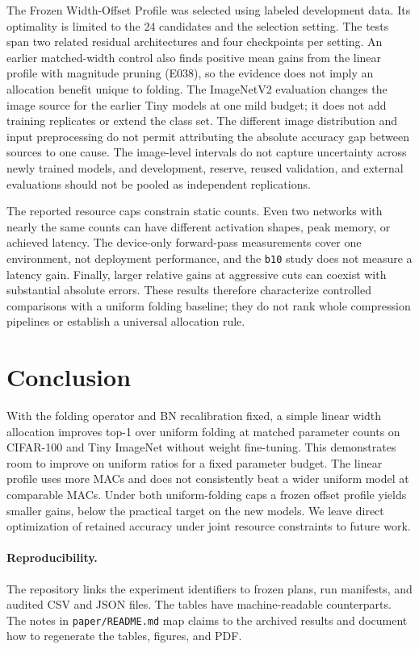 \documentclass[11pt,a4paper]{article}
\newcommand{\FrozenProfile}{Frozen Width-Offset Profile}
\newcommand{\bten}{\texttt{b10}}
\begin{document}
The \FrozenProfile{} was selected using labeled development data. Its
optimality is limited to the 24 candidates and the selection setting.
The tests span two related residual architectures and four
checkpoints per setting. An earlier matched-width control also finds
positive mean gains from the linear profile with magnitude pruning (E038),
so the evidence does not imply an allocation benefit unique to folding.
The ImageNetV2 evaluation changes the image source for the earlier Tiny
models at one mild budget; it does not add training
replicates or extend the class set. The different image distribution and
input preprocessing do not permit attributing the absolute accuracy gap
between sources to one cause. The image-level intervals do not capture uncertainty across
newly trained models, and development, reserve, reused validation, and
external evaluations should not be pooled as independent replications.

The reported resource caps constrain static counts. Even two networks
with nearly the same counts can have different activation shapes, peak
memory, or achieved latency. The device-only forward-pass measurements
cover one environment, not deployment performance, and the \bten{} study
does not measure a latency gain. Finally, larger relative gains at
aggressive cuts can coexist with substantial absolute errors. These results therefore
characterize controlled comparisons with a uniform folding baseline;
they do not rank whole compression pipelines or establish a universal
allocation rule.

\section{Conclusion}

With the folding operator and BN recalibration fixed, a simple linear
width allocation improves top-1 over uniform folding at matched parameter
counts on CIFAR-100 and Tiny ImageNet without weight fine-tuning. This
demonstrates room to improve on uniform ratios for a fixed parameter
budget. The linear profile uses more MACs and does not consistently beat
a wider uniform model at comparable MACs. Under both uniform-folding
caps a frozen offset profile yields smaller gains, below the practical
target on the new models. We leave direct optimization of retained
accuracy under joint resource constraints to future work.

\paragraph{Reproducibility.} The repository links the experiment identifiers
to frozen plans, run manifests, and audited CSV and JSON files. The tables
have machine-readable counterparts. The notes in \texttt{paper/README.md}
map claims to the archived results and document how to regenerate the
tables, figures, and PDF.

\begingroup
\small
\raggedright


\endgroup
\end{document}
